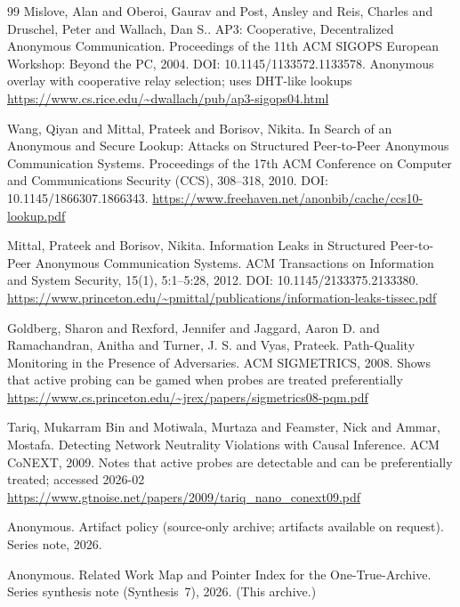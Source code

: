 \documentclass[11pt]{article}
\begin{document}
\begin{thebibliography}{99}
Mislove, Alan and Oberoi, Gaurav and Post, Ansley and Reis, Charles and Druschel, Peter and Wallach, Dan S..
\newblock AP3: Cooperative, Decentralized Anonymous Communication.
\newblock Proceedings of the 11th ACM SIGOPS European Workshop: Beyond the PC, 2004.
\newblock DOI: 10.1145/1133572.1133578.
\newblock Anonymous overlay with cooperative relay selection; uses DHT-like lookups
\newblock \url{https://www.cs.rice.edu/~dwallach/pub/ap3-sigops04.html}

Wang, Qiyan and Mittal, Prateek and Borisov, Nikita.
\newblock In Search of an Anonymous and Secure Lookup: Attacks on Structured Peer-to-Peer Anonymous Communication Systems.
\newblock Proceedings of the 17th ACM Conference on Computer and Communications Security (CCS), 308--318, 2010.
\newblock DOI: 10.1145/1866307.1866343.
\newblock \url{https://www.freehaven.net/anonbib/cache/ccs10-lookup.pdf}

Mittal, Prateek and Borisov, Nikita.
\newblock Information Leaks in Structured Peer-to-Peer Anonymous Communication Systems.
\newblock ACM Transactions on Information and System Security, 15(1), 5:1--5:28, 2012.
\newblock DOI: 10.1145/2133375.2133380.
\newblock \url{https://www.princeton.edu/~pmittal/publications/information-leaks-tissec.pdf}

Goldberg, Sharon and Rexford, Jennifer and Jaggard, Aaron D. and Ramachandran, Anitha and Turner, J. S. and Vyas, Prateek.
\newblock Path-Quality Monitoring in the Presence of Adversaries.
\newblock ACM SIGMETRICS, 2008.
\newblock Shows that active probing can be gamed when probes are treated preferentially
\newblock \url{https://www.cs.princeton.edu/~jrex/papers/sigmetrics08-pqm.pdf}

Tariq, Mukarram Bin and Motiwala, Murtaza and Feamster, Nick and Ammar, Mostafa.
\newblock Detecting Network Neutrality Violations with Causal Inference.
\newblock ACM CoNEXT, 2009.
\newblock Notes that active probes are detectable and can be preferentially treated; accessed 2026-02
\newblock \url{https://www.gtnoise.net/papers/2009/tariq_nano_conext09.pdf}

Anonymous.
\newblock Artifact policy (source-only archive; artifacts available on request).
\newblock Series note, 2026.

Anonymous.
\newblock Related Work Map and Pointer Index for the One-True-Archive.
\newblock Series synthesis note (Synthesis~7), 2026. (This archive.)

\end{thebibliography}
\end{document}
